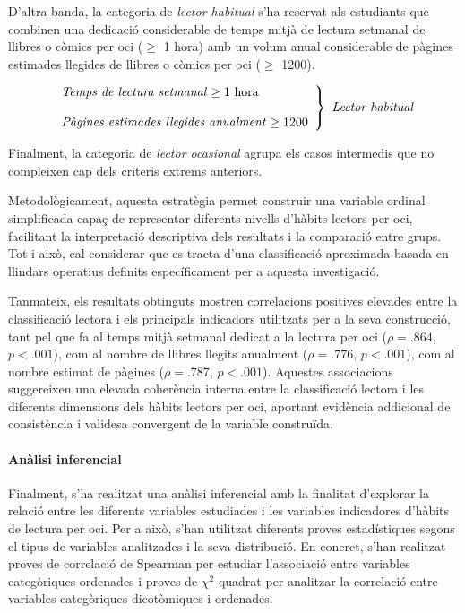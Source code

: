 \documentclass[12pt]{article}
\begin{document}
D'altra banda, la categoria de \emph{lector habitual} s’ha reservat als estudiants que combinen una dedicació considerable de temps mitjà de lectura setmanal de llibres o còmics per oci ($\geq$ 1 hora) amb un volum anual considerable de pàgines estimades llegides de llibres o còmics per oci ($\geq$ 1200).

\[
\left.
\begin{array}{l}
\text{\emph{Temps de lectura setmanal}} \geq 1 \text{ hora} \\\\
\text{\emph{Pàgines estimades llegides anualment}} \geq 1200
\end{array}
\right\}
\textit{ Lector habitual}
\]

Finalment, la categoria de \emph{lector ocasional} agrupa els casos intermedis que no compleixen cap dels criteris extrems anteriors.

Metodològicament, aquesta estratègia permet construir una variable ordinal simplificada capaç de representar diferents nivells d’hàbits lectors per oci, facilitant la interpretació descriptiva dels resultats i la comparació entre grups. Tot i això, cal considerar que es tracta d’una classificació aproximada basada en llindars operatius definits específicament per a aquesta investigació.

Tanmateix, els resultats obtinguts mostren correlacions positives elevades entre la classificació lectora i els principals indicadors utilitzats per a la seva construcció, tant pel que fa al temps mitjà setmanal dedicat a la lectura per oci ($\rho = .864$, $p < .001$), com al nombre de llibres llegits anualment ($\rho = .776$, $p < .001$), com al nombre estimat de pàgines ($\rho = .787$, $p < .001$). Aquestes associacions suggereixen una elevada coherència interna entre la classificació lectora i les diferents dimensions dels hàbits lectors per oci, aportant evidència addicional de consistència i validesa convergent de la variable construïda.

\paragraph{Anàlisi inferencial}

Finalment, s'ha realitzat una anàlisi inferencial amb la finalitat d’explorar la relació entre les diferents variables estudiades i les variables indicadores d'hàbits de lectura per oci. Per a això, s'han utilitzat diferents proves estadístiques segons el tipus de variables analitzades i la seva distribució. En concret, s'han realitzat proves de correlació de Spearman per estudiar l'associació entre variables categòriques ordenades i proves de $\chi^2$ quadrat per analitzar la correlació entre variables categòriques dicotòmiques i ordenades.
\end{document}
